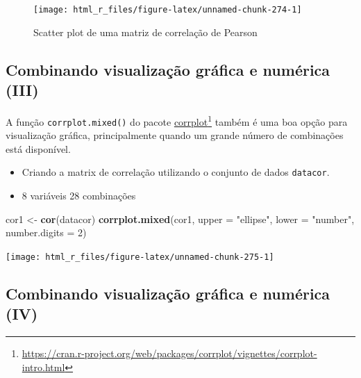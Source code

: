 \documentclass[
]{book}
\newenvironment{Shaded}{\begin{snugshade}}{\end{snugshade}}
\newcommand{\DataTypeTok}[1]{\textcolor[rgb]{0.13,0.29,0.53}{#1}}
\newcommand{\DecValTok}[1]{\textcolor[rgb]{0.00,0.00,0.81}{#1}}
\newcommand{\KeywordTok}[1]{\textcolor[rgb]{0.13,0.29,0.53}{\textbf{#1}}}
\newcommand{\NormalTok}[1]{#1}
\newcommand{\StringTok}[1]{\textcolor[rgb]{0.31,0.60,0.02}{#1}}
\providecommand{\tightlist}{%
  \setlength{\itemsep}{0pt}\setlength{\parskip}{0pt}}
\begin{document}
\begin{figure}

{\centering \texttt{[image: html\_r\_files/figure-latex/unnamed-chunk-274-1]} 

}

\caption{Scatter plot de uma matriz de correlação de Pearson}\label{fig:unnamed-chunk-274}
\end{figure}

\hypertarget{combinando-visualizauxe7uxe3o-gruxe1fica-e-numuxe9rica-iii}{%
\subsection{Combinando visualização gráfica e numérica (III)}\label{combinando-visualizauxe7uxe3o-gruxe1fica-e-numuxe9rica-iii}}


A função \texttt{corrplot.mixed()}  do pacote \href{https://cran.r-project.org/web/packages/corrplot/vignettes/corrplot-intro.html}{corrplot}\footnote{\url{https://cran.r-project.org/web/packages/corrplot/vignettes/corrplot-intro.html}} também é uma boa opção para visualização gráfica, principalmente quando um grande número de combinações está disponível.

\begin{itemize}
\tightlist
\item
  Criando a matrix de correlação utilizando o conjunto de dados \texttt{datacor}.
\item
  8 variáveis \textbar{} 28 combinações
\end{itemize}

\begin{Shaded}
\begin{Highlighting}[]

\NormalTok{cor1 <-}\StringTok{ }\KeywordTok{cor}\NormalTok{(datacor)}
\KeywordTok{corrplot.mixed}\NormalTok{(cor1,}
               \DataTypeTok{upper =} \StringTok{"ellipse"}\NormalTok{,}
               \DataTypeTok{lower =} \StringTok{"number"}\NormalTok{,}
               \DataTypeTok{number.digits =} \DecValTok{2}\NormalTok{)}
\end{Highlighting}
\end{Shaded}

\begin{center}\texttt{[image: html\_r\_files/figure-latex/unnamed-chunk-275-1]} \end{center}

\hypertarget{combinando-visualizauxe7uxe3o-gruxe1fica-e-numuxe9rica-iv}{%
\subsection{Combinando visualização gráfica e numérica (IV)}\label{combinando-visualizauxe7uxe3o-gruxe1fica-e-numuxe9rica-iv}}
\end{document}
